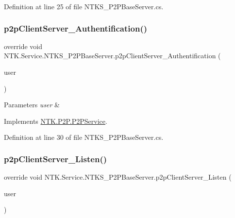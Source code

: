 Definition at line 25 of file N\+T\+K\+S\+\_\+\+P2\+P\+Base\+Server.\+cs.

\mbox{\label{class_n_t_k_1_1_service_1_1_n_t_k_s___p2_p_base_server_aeed4f0e761b2b5366b1c5c5595941a26}} 
\subsubsection{\texorpdfstring{p2pClientServer\_Authentification()}{p2pClientServer\_Authentification()}}
{\footnotesize\ttfamily override void N\+T\+K.\+Service.\+N\+T\+K\+S\+\_\+\+P2\+P\+Base\+Server.\+p2p\+Client\+Server\+\_\+\+Authentification (\begin{DoxyParamCaption}\item[{\mbox{\hyperlink{class_n_t_k_1_1_n_t_k_user}{N\+T\+K\+User}}}]{user }\end{DoxyParamCaption})\hspace{0.3cm}{\ttfamily [virtual]}}






\begin{DoxyParams}{Parameters}
{\em user} & \\
\hline
\end{DoxyParams}


Implements \mbox{\hyperlink{class_n_t_k_1_1_p2_p_1_1_p2_p_service_ac4adf79dade09cfcbb37a74632cdc6c2}{N\+T\+K.\+P2\+P.\+P2\+P\+Service}}.



Definition at line 30 of file N\+T\+K\+S\+\_\+\+P2\+P\+Base\+Server.\+cs.

\mbox{\label{class_n_t_k_1_1_service_1_1_n_t_k_s___p2_p_base_server_a328bbae01750cee242ecf00a4d0db350}} 
\subsubsection{\texorpdfstring{p2pClientServer\_Listen()}{p2pClientServer\_Listen()}}
{\footnotesize\ttfamily override void N\+T\+K.\+Service.\+N\+T\+K\+S\+\_\+\+P2\+P\+Base\+Server.\+p2p\+Client\+Server\+\_\+\+Listen (\begin{DoxyParamCaption}\item[{\mbox{\hyperlink{class_n_t_k_1_1_n_t_k_user}{N\+T\+K\+User}}}]{user }\end{DoxyParamCaption})\hspace{0.3cm}{\ttfamily [virtual]}}






